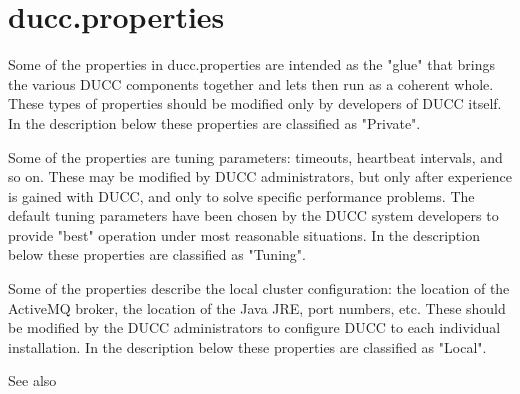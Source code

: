 \section{ducc.properties}
\label{sec:ducc.properties}
   
    Some of the properties in ducc.properties are intended as the "glue" that brings the various 
    DUCC components together and lets then run as a coherent whole. These types of properties should 
    be modified only by developers of DUCC itself. In the description below these properties are 
    classified as "Private". 

    Some of the properties are tuning parameters: timeouts, heartbeat intervals, and so on. These
    may be modified by DUCC administrators, but only after experience is gained with DUCC, and only
    to solve specific performance problems. The default tuning parameters have been chosen by the
    DUCC system developers to provide "best" operation under most reasonable situations. In the
    description below these properties are classified as "Tuning".

    Some of the properties describe the local cluster configuration: the location of the ActiveMQ
    broker, the location of the Java JRE, port numbers, etc. These should be modified by the DUCC
    administrators to configure DUCC to each individual installation. In the description below these
    properties are classified as "Local".
    
    See also 
    
